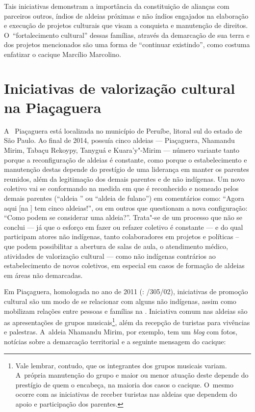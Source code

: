 Tais iniciativas demonstram a importância da constituição de alianças
com parceiros outros, índios de aldeias próximas e não índios engajados
na elaboração e execução de projetos culturais que visam a conquista e
manutenção de direitos. O~``fortalecimento cultural'' dessas famílias,
através da demarcação de sua terra e dos projetos mencionados são uma
forma de ``continuar existindo'', como costuma enfatizar o cacique Marcílio
Marcolino. 

\section{Iniciativas de valorização cultural na  Piaçaguera}

A~ Piaçaguera está localizada no município de Peruíbe, litoral sul do
estado de São Paulo. Ao final de 2014, possuía cinco aldeias ---
Piaçaguera, Nhamandu Mirim, Tabaçu Rekoypy, Tanyguá e Kuara’y"-Mirim ---
número variante tanto porque a reconfiguração de aldeias é constante,
como porque o estabelecimento e manutenção destas depende do prestígio
de uma liderança em manter os parentes reunidos, além da legitimação
dos demais parentes e de não indígenas. Um novo coletivo vai se
conformando na medida em que é reconhecido e nomeado pelos demais
parentes (``aldeia '' ou ``aldeia de fulano'') em comentários como: ``Agora
aqui [na ] tem cinco aldeias!'', ou em outros que questionam a nova
configuração: ``Como podem se considerar uma aldeia?''. Trata"-se de um
processo que não se conclui --- já que o esforço em fazer ou refazer
coletivo é constante --- e do qual participam atores não indígenas, tanto
colaboradores em projetos e políticas – que podem possibilitar a
abertura de salas de aula, o atendimento médico, atividades de
valorização cultural --- como não indígenas contrários ao estabelecimento
de novos coletivos, em especial em casos de formação de aldeias em
áreas não demarcadas. 

Em Piaçaguera,  homologada no ano de 2011 (: /305/02),
iniciativas de promoção cultural são um modo de se relacionar com
alguns não indígenas, assim como mobilizam relações entre pessoas e
famílias na . Iniciativa comum nas aldeias são as apresentações de
grupos musicais\footnote{Vale lembrar, contudo, que os integrantes dos
grupos musicais variam. A~própria manutenção do grupo e maior ou menor
atuação deste depende do prestígio de quem o encabeça, na maioria dos
casos o cacique. O~mesmo ocorre com as iniciativas de receber turistas
nas aldeias que dependem do apoio e participação dos parentes.}, além
da recepção de turistas para vivências e palestras. A~aldeia Nhamandu
Mirim, por exemplo, tem um \emph{blog} com fotos, notícias sobre a demarcação
territorial e a seguinte mensagem do cacique:

